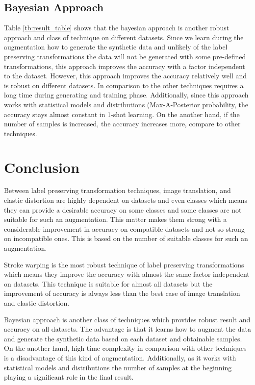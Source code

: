 \subsection{Bayesian Approach}
Table \ref{tb:result_table} shows that the bayesian approach is
another robust approach and class of technique on different datasets. Since we learn during the
augmentation how to generate the synthetic data and unlikely of the label preserving transformations
the data will not be generated with some pre-defined transformations, this approach improves the
accuracy with a factor independent to the dataset. However, this approach improves the accuracy
relatively well and is robust on different datasets. In comparison to the other techniques requires
a long time during generating and training phase. Additionally, since this approach works with
statistical models and distributions (Max-A-Posterior probability, the accuracy stays almost constant in
1-shot learning. On the another hand, if the number of samples is increased, the accuracy
increases more, compare to other techniques.

\section{Conclusion}
Between label preserving transformation techniques, image translation, and elastic distortion are
highly dependent on datasets and even classes which means they can provide a desirable accuracy on
some classes and some classes are not suitable for such an augmentation. This matter makes them
strong with a considerable improvement in accuracy on compatible datasets and not so strong on
incompatible ones. This is based on the number of suitable classes for such an augmentation.

Stroke warping is the most robust technique of label preserving transformations which means they improve the accuracy with almost the same factor independent on datasets. This technique is suitable for almost all datasets but the improvement of accuracy is always less than the best case of image translation and elastic distortion.

Bayesian approach is another class of techniques which provides robust result and accuracy on all
datasets. The advantage is that it learns how to augment the data and generate the synthetic data
based on each dataset and obtainable samples. On the another hand, high time-complexity in comparison
with other techniques is a disadvantage of this kind of augmentation. Additionally, as it works with
statistical models and distributions the number of samples at the beginning playing a significant
role in the final result.

